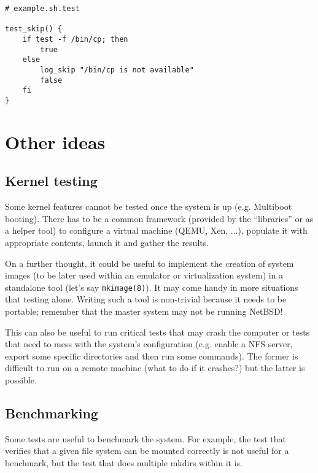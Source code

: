 \documentclass[a4paper,10pt]{article}
\begin{document}
\begin{verbatim}
# example.sh.test

test_skip() {
    if test -f /bin/cp; then
        true
    else
        log_skip "/bin/cp is not available"
        false
    fi
}
\end{verbatim}


\section{Other ideas}


\subsection{Kernel testing}
\label{sec:mkimage}

Some kernel features cannot be tested once the system is up (e.g. Multiboot
booting).  There has to be a common framework (provided by the
``libraries'' or as a helper tool) to configure a virtual machine (QEMU,
Xen, ...), populate it with appropriate contents, launch it and gather the
results.

On a further thought, it could be useful to implement the creation of
system images (to be later used within an emulator or virtualization
system) in a
standalone tool (let's say \verb*|mkimage(8)|).  It may come handy in more
situations that testing alone.  Writing such a tool is non-trivial because
it needs to be portable; remember that the master system may not be
running NetBSD!

This can also be useful to run critical tests that may crash the computer
or tests that need to mess with the system's configuration (e.g. enable a
NFS server, export some specific directories and then run some commands).
The former is difficult to run on a remote machine (what to do if it
crashes?) but the latter is possible.


\subsection{Benchmarking}

Some tests are useful to benchmark the system.  For example, the test that
verifies that a given file system can be mounted correctly is not useful
for a benchmark, but the test that does multiple mkdirs within it is.
\end{document}
